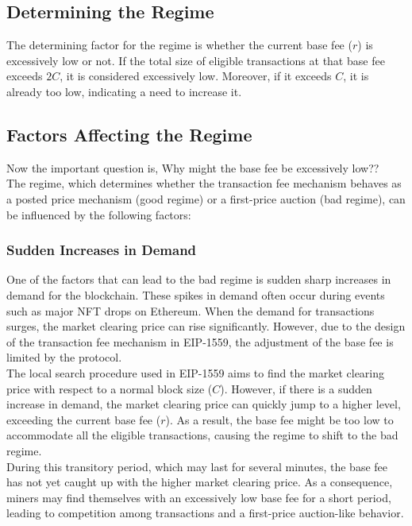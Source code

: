 \subsection{Determining the Regime}
The determining factor for the regime is whether the current base fee ($r$) is excessively low or not. If the total size of eligible transactions at that base fee exceeds $2C$, it is considered excessively low. Moreover, if it exceeds $C$, it is already too low, indicating a need to increase it.\\


\subsection{Factors Affecting the Regime}
Now the important question is, Why might the base fee be excessively low??\\
The regime, which determines whether the transaction fee mechanism behaves as a posted price mechanism (good regime) or a first-price auction (bad regime), can be influenced by the following factors:

\subsubsection{Sudden Increases in Demand}
One of the factors that can lead to the bad regime is sudden sharp increases in demand for the blockchain. These spikes in demand often occur during events such as major NFT drops on Ethereum. When the demand for transactions surges, the market clearing price can rise significantly. However, due to the design of the transaction fee mechanism in EIP-1559, the adjustment of the base fee is limited by the protocol.\\

The local search procedure used in EIP-1559 aims to find the market clearing price with respect to a normal block size ($C$). However, if there is a sudden increase in demand, the market clearing price can quickly jump to a higher level, exceeding the current base fee ($r$). As a result, the base fee might be too low to accommodate all the eligible transactions, causing the regime to shift to the bad regime.\\

During this transitory period, which may last for several minutes, the base fee has not yet caught up with the higher market clearing price. As a consequence, miners may find themselves with an excessively low base fee for a short period, leading to competition among transactions and a first-price auction-like behavior.

